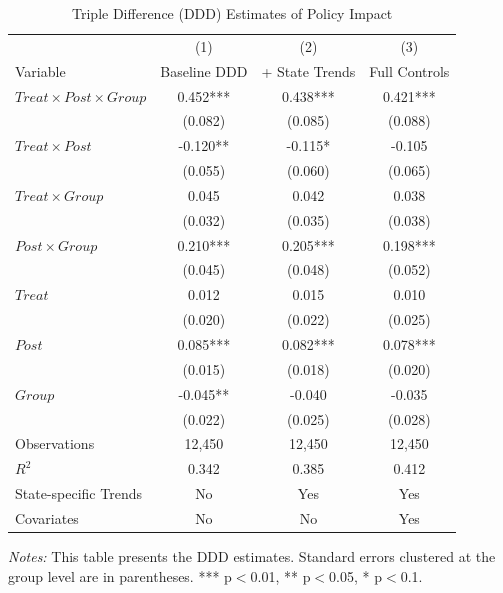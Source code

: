 \documentclass{article}
\begin{document}
\begin{table}[htbp]
    \centering
    \begin{threeparttable}
    \caption{Triple Difference (DDD) Estimates of Policy Impact}
    \label{tab:ddd_impact}
    \begin{tabular}{l *{3}{S}}
        \toprule
        & {(1)} & {(2)} & {(3)} \\
        Variable & {Baseline DDD} & {+ State Trends} & {Full Controls} \\
        \midrule
        $Treat \times Post \times Group$ & 0.452*** & 0.438*** & 0.421*** \\
                                        & (0.082)   & (0.085)   & (0.088)   \\
        \addlinespace
        $Treat \times Post$             & -0.120**  & -0.115*   & -0.105    \\
                                        & (0.055)   & (0.060)   & (0.065)   \\
        $Treat \times Group$            & 0.045     & 0.042     & 0.038     \\
                                        & (0.032)   & (0.035)   & (0.038)   \\
        $Post \times Group$             & 0.210***  & 0.205***  & 0.198***  \\
                                        & (0.045)   & (0.048)   & (0.052)   \\
        \addlinespace
        $Treat$                         & 0.012     & 0.015     & 0.010     \\
                                        & (0.020)   & (0.022)   & (0.025)   \\
        $Post$                          & 0.085***  & 0.082***  & 0.078***  \\
                                        & (0.015)   & (0.018)   & (0.020)   \\
        $Group$                         & -0.045**  & -0.040    & -0.035    \\
                                        & (0.022)   & (0.025)   & (0.028)   \\
        \midrule
        Observations                    & {12,450}  & {12,450}  & {12,450}  \\
        $R^2$                           & 0.342     & 0.385     & 0.412     \\
        State-specific Trends           & {No}      & {Yes}     & {Yes}     \\
        Covariates                      & {No}      & {No}      & {Yes}     \\
        \bottomrule
    \end{tabular}
    \begin{tablenotes}
        \small
        \item \textit{Notes:} This table presents the DDD estimates. Standard errors clustered at the group level are in parentheses. *** p$<$0.01, ** p$<$0.05, * p$<$0.1.
    \end{tablenotes}
    \end{threeparttable}
\end{table}
\end{document}

